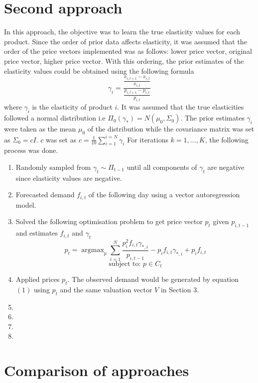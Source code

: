 \documentclass[a4paper]{article}
\DeclareMathOperator*{\argmax}{argmax}
\begin{document}
\section{Second approach}
In this approach, the objective was to learn the true elasticity values for each product. Since the order of prior data affects elasticity, it was assumed that the order of the price vectors implemented was as follows: lower price vector, original price vector, higher price vector. With this ordering, the prior estimates of the elasticity values could be obtained using the following formula
\[\gamma_i = \frac{\frac{x_{i,t+1}-x_{i,t}}{x_{i,t}}}{\frac{p_{i,t+1}-p_{i,t}}{p_{i,t}}}\]
where $\gamma_i$ is the elasticity of product $i$. It was assumed that the true elasticities followed a normal distribution i.e $\Pi_0(\gamma_*)=N(\mu_0,\Sigma_0)$. The prior estimates $\gamma_i$ were taken as the mean $\mu_0$ of the distribution while the covariance matrix was set as $\Sigma_0 = cI$. $c$ was set as $c = \frac{1}{10}\sum_{i=1}^{i=N}\gamma_i$
\newline
\newline
For iterations $k = 1,...,K$, the following process was done. 
\begin{enumerate}
	\item Randomly sampled from $\gamma_t \sim \Pi_{t-1}$ until all components of $\gamma_t$ are negative since elasticity values are negative.
	\item Forecasted demand $f_{i,t}$ of the following day using a vector autoregression model.
	\item Solved the following optimisation problem to get price vector $p_t$ given $p_{i,t-1}$ and estimates $f_{i,t}$ and $\gamma_t$ \[p_t = \argmax_p \sum_{i=1}^{N}\frac{p_i^2f_{i,t}\gamma_{*,i}}{p_{i,t-1}} -p_if_{i,t}\gamma_{*,i} + p_if_{i,t}\] \[\text{subject to: } p \in C_t \]
	\item Applied prices $p_t$. The observed demand would be generated by equation $(1)$ using $p_t$ and the same valuation vector $V$ in Section 3.
	\item 
	\item 
	\item 
	\item
\end{enumerate}

\section{Comparison of approaches}
\end{document}
